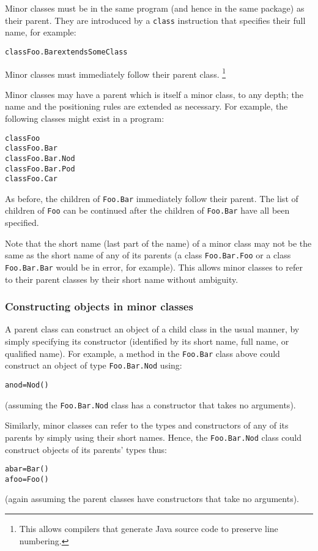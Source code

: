 Minor classes must be in the same program (and hence in the same
package) as their parent.  They are introduced by a \texttt{class}
instruction that specifies their full name, for example:
\begin{alltt}
class Foo.Bar extends SomeClass
\end{alltt}
 
Minor classes must immediately follow their parent class.
\footnote{
This allows compilers that generate Java source code to preserve line
numbering.
}
 
Minor classes may have a parent which is itself a minor class,
to any depth; the name and the positioning rules are extended as
necessary.  For example, the following classes might exist in a program:
\begin{alltt}
class Foo
  class Foo.Bar
    class Foo.Bar.Nod
    class Foo.Bar.Pod
  class Foo.Car
\end{alltt}
 
As before, the children of \texttt{Foo.Bar} immediately follow their
parent.  The list of children of \texttt{Foo} can be continued after
the children of \texttt{Foo.Bar} have all been specified.
 
Note that the short name (last part of the name) of a minor class may
not be the same as the short name of any of its parents (a
class \texttt{Foo.Bar.Foo} or a class \texttt{Foo.Bar.Bar} would be in
error, for example).  This allows minor classes to refer to their parent
classes by their short name without ambiguity.
\subsubsection{Constructing objects in minor classes}
 
A parent class can construct an object of a child class in the usual
manner, by simply specifying its constructor (identified by its short
name, full name, or qualified name).
For example, a method in the \texttt{Foo.Bar} class above could construct
an object of type \texttt{Foo.Bar.Nod} using:
\begin{alltt}
anod=Nod()
\end{alltt}
(assuming the \texttt{Foo.Bar.Nod} class has a constructor that takes no
arguments).
 
Similarly, minor classes can refer to the types and constructors of any
of its parents by simply using their short names.
Hence, the \texttt{Foo.Bar.Nod} class could construct objects of its
parents' types thus:
\begin{alltt}
abar=Bar()
afoo=Foo()
\end{alltt}
(again assuming the parent classes have constructors that take no
arguments).
 
